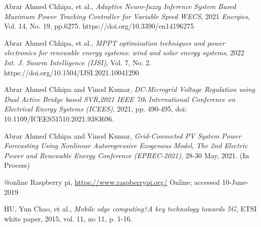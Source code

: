 \begin{thebibliography}{99}
	 Abrar Ahmed Chhipa, et al., \emph{Adaptive Neuro-fuzzy Inference System Based Maximum Power Tracking Controller for Variable Speed WECS}, 2021 \textit{Energies}, Vol. 14, No. 19, pp.6275. https://doi.org/10.3390/en14196275
	
	 Abrar Ahmed Chhipa, et al., \emph{MPPT optimisation techniques and power electronics for renewable energy systems: wind and solar energy systems}, 2022 \textit{Int. J. Swarm Intelligence (IJSI)}, Vol. 7, No. 2. https://doi.org/10.1504/IJSI.2021.10041290
	
	 Abrar Ahmed Chhipa and Vinod Kumar, \emph{DC-Microgrid Voltage Regulation using Dual Active Bridge based SVR},\textit{2021 IEEE 7th International Conference on Electrical Energy Systems (ICEES)}, 2021, pp. 490-495, doi: 10.1109/ICEES51510.2021.9383696.
	
	 Abrar Ahmed Chhipa and Vinod Kumar, \emph{Grid-Connected PV System Power Forecasting Using Nonlinear Autoregressive Exogenous Model}, \textit{The 2nd Electric Power and Renewable Energy Conference (EPREC-2021)}, 28-30 May, 2021. (In Process)
	
	@online{ Raspberry pi,
		\url{https://www.raspberrypi.org/}
		Online; accessed 10-June-2019
	}
	
	 HU, Yun Chao, et al., \emph{Mobile edge computing?A key technology
		towards 5G}, ETSI white paper, 2015, vol. 11, no 11, p. 1-16.		
\end{thebibliography}
